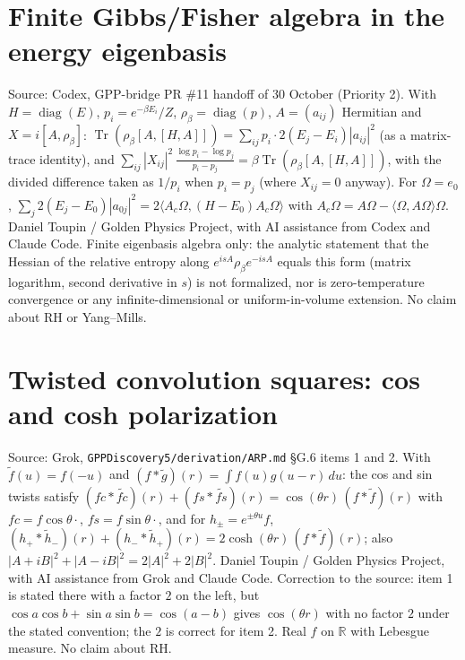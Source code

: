 \documentclass{report}
\theoremstyle{definition}
\begin{document}
\begin{itemize}
\begin{itemize}
\section{Finite Gibbs/Fisher algebra in the energy eigenbasis}
Source: Codex, GPP-bridge PR \#11 handoff of 30 October (Priority 2). With $H=\operatorname{diag}(E)$, $p_i=e^{-\beta E_i}/Z$, $\rho_\beta=\operatorname{diag}(p)$, $A=(a_{ij})$ Hermitian and $X=i[A,\rho_\beta]$:
$\operatorname{Tr}(\rho_\beta[A,[H,A]])=\sum_{ij}p_i\cdot2(E_j-E_i)|a_{ij}|^2$ (as a matrix-trace identity), and
$\sum_{ij}|X_{ij}|^2\,\frac{\log p_i-\log p_j}{p_i-p_j}=\beta\operatorname{Tr}(\rho_\beta[A,[H,A]])$, with the divided difference taken as $1/p_i$ when $p_i=p_j$ (where $X_{ij}=0$ anyway). For $\Omega=e_0$,
$\sum_j2(E_j-E_0)|a_{0j}|^2=2\langle A_c\Omega,(H-E_0)A_c\Omega\rangle$ with $A_c\Omega=A\Omega-\langle\Omega,A\Omega\rangle\Omega$.
Daniel Toupin / Golden Physics Project, with AI assistance from Codex and Claude Code. Finite eigenbasis algebra only: the analytic statement that the Hessian of the relative entropy along $e^{isA}\rho_\beta e^{-isA}$ equals this form
(matrix logarithm, second derivative in $s$) is not formalized, nor is zero-temperature convergence or any infinite-dimensional or uniform-in-volume extension. No claim about RH or Yang--Mills.

\section{Twisted convolution squares: cos and cosh polarization}
Source: Grok, \texttt{GPPDiscovery5/derivation/ARP.md} \S G.6 items 1 and 2. With $\tilde f(u)=f(-u)$ and $(f*\tilde g)(r)=\int f(u)g(u-r)\,du$: the cos and sin twists satisfy
$(fc*\widetilde{fc})(r)+(fs*\widetilde{fs})(r)=\cos(\theta r)\,(f*\tilde f)(r)$ with $fc=f\cos\theta\cdot$, $fs=f\sin\theta\cdot$, and for $h_\pm=e^{\pm\theta u}f$,
$(h_+*\tilde h_-)(r)+(h_-*\tilde h_+)(r)=2\cosh(\theta r)\,(f*\tilde f)(r)$; also $|A+iB|^2+|A-iB|^2=2|A|^2+2|B|^2$.
Daniel Toupin / Golden Physics Project, with AI assistance from Grok and Claude Code. Correction to the source: item 1 is stated there with a factor $2$ on the left, but $\cos a\cos b+\sin a\sin b=\cos(a-b)$ gives $\cos(\theta r)$ with no factor $2$ under the stated convention; the $2$ is correct for item 2.
Real $f$ on $\mathbb R$ with Lebesgue measure. No claim about RH.


\end{itemize}
\end{itemize}
\end{document}
